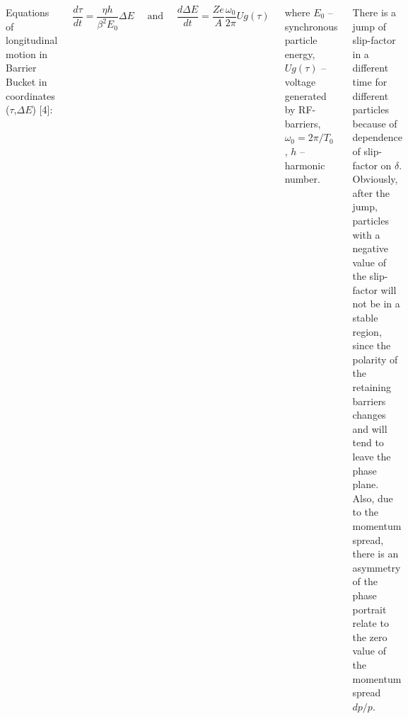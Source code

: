 \documentclass[25pt, a0paper, portrait, blockverticalspace=.5cm]{tikzposter}
\begin{document}
\begin{columns}
{\begin{minipage}{0.28\linewidth}
		\end{minipage}
		
		\par Equations of longitudinal motion in Barrier Bucket in coordinates ($\tau$,$\Delta E$) [4]: 
		
		\begin{equation}
		\frac{d \tau}{dt}=\frac{\eta h}{\beta^{2} E_{0}} \Delta E \quad \text { and } \quad \frac{d \Delta E}{dt}=\frac{Ze}{A} \frac{\omega_{0}}{2 \pi} U g(\tau)
		\end{equation}

\par where $E_0$ – synchronous particle energy, $Ug(\tau)$ – voltage generated by RF-barriers, $\omega_{0}=2\pi/T_{0}$ , $h$ – harmonic number.\\
		
\par There is a jump of slip-factor in a different time for different particles because of dependence of slip-factor on $\delta$. Obviously, after the jump, particles with a negative value of the slip-factor will not be in a stable region, since the polarity of the retaining barriers changes and will tend to leave the phase plane. Also, due to the momentum spread, there is an asymmetry of the phase portrait relate to the zero value of the momentum spread $dp/p$.\\
		
}
\end{columns}
\end{document}
